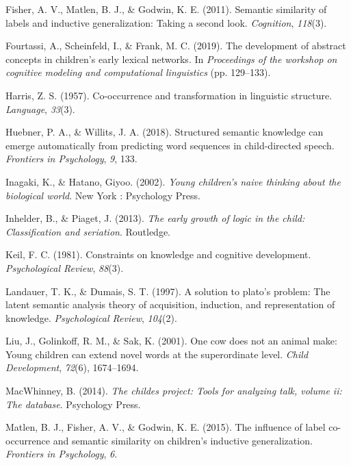 \documentclass[english,,man,floatsintext]{apa6}
\begin{document}
\leavevmode\hypertarget{ref-fisher2011}{}%
Fisher, A. V., Matlen, B. J., \& Godwin, K. E. (2011). Semantic similarity of labels and inductive generalization: Taking a second look. \emph{Cognition}, \emph{118}(3).

\leavevmode\hypertarget{ref-fourtassi2019}{}%
Fourtassi, A., Scheinfeld, I., \& Frank, M. C. (2019). The development of abstract concepts in children's early lexical networks. In \emph{Proceedings of the workshop on cognitive modeling and computational linguistics} (pp. 129--133).

\leavevmode\hypertarget{ref-harris1957}{}%
Harris, Z. S. (1957). Co-occurrence and transformation in linguistic structure. \emph{Language}, \emph{33}(3).

\leavevmode\hypertarget{ref-huebner2018}{}%
Huebner, P. A., \& Willits, J. A. (2018). Structured semantic knowledge can emerge automatically from predicting word sequences in child-directed speech. \emph{Frontiers in Psychology}, \emph{9}, 133.

\leavevmode\hypertarget{ref-inagaki2002}{}%
Inagaki, K., \& Hatano, Giyoo. (2002). \emph{Young children's naive thinking about the biological world}. New York : Psychology Press.

\leavevmode\hypertarget{ref-inhelder2013}{}%
Inhelder, B., \& Piaget, J. (2013). \emph{The early growth of logic in the child: Classification and seriation}. Routledge.

\leavevmode\hypertarget{ref-keil1981}{}%
Keil, F. C. (1981). Constraints on knowledge and cognitive development. \emph{Psychological Review}, \emph{88}(3).

\leavevmode\hypertarget{ref-landauer1997}{}%
Landauer, T. K., \& Dumais, S. T. (1997). A solution to plato's problem: The latent semantic analysis theory of acquisition, induction, and representation of knowledge. \emph{Psychological Review}, \emph{104}(2).

\leavevmode\hypertarget{ref-liu2001}{}%
Liu, J., Golinkoff, R. M., \& Sak, K. (2001). One cow does not an animal make: Young children can extend novel words at the superordinate level. \emph{Child Development}, \emph{72}(6), 1674--1694.

\leavevmode\hypertarget{ref-macwhinney2014}{}%
MacWhinney, B. (2014). \emph{The childes project: Tools for analyzing talk, volume ii: The database}. Psychology Press.

\leavevmode\hypertarget{ref-matlen2015}{}%
Matlen, B. J., Fisher, A. V., \& Godwin, K. E. (2015). The influence of label co-occurrence and semantic similarity on children's inductive generalization. \emph{Frontiers in Psychology}, \emph{6}.
\end{document}
